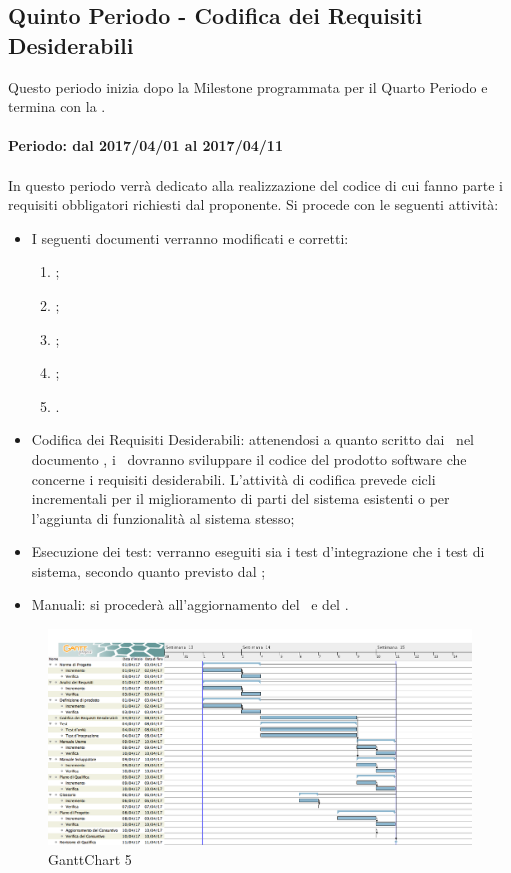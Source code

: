 \documentclass[../PianoDiProgetto_v4.0.0.tex]{subfiles}
\begin{document}
	\newpage
	\subsection{Quinto Periodo - Codifica dei Requisiti Desiderabili}
	Questo periodo inizia dopo la Milestone programmata per il Quarto Periodo e termina con la \revisionediqualifica.
	\\
	\\
	\textbf{Periodo: dal 2017/04/01 al 2017/04/11}
	\\
	\\
	 In questo periodo verrà dedicato alla realizzazione del codice di cui fanno parte i requisiti obbligatori richiesti dal proponente.
	Si procede con le seguenti attività:
	\begin{itemize}
		\item I seguenti documenti verranno modificati e corretti:
			\begin{enumerate}
				\item \manualesviluppatore;
				\item \manualeutente;
				\item \pianodiqualifica;
				\item \pianodiprogetto;
				\item \glossario.
			\end{enumerate}
		\item Codifica dei Requisiti Desiderabili: attenendosi a quanto scritto dai \progettisti\ nel documento , i \programmatori\ dovranno sviluppare il codice del prodotto software che concerne i requisiti desiderabili. L'attività di codifica prevede cicli incrementali per il miglioramento di parti del sistema esistenti o per l'aggiunta di funzionalità al sistema stesso;
		\item Esecuzione dei test: verranno eseguiti sia i test d'integrazione che i test di sistema, secondo quanto previsto dal \pianodiqualifica;		
		\item Manuali: si procederà all'aggiornamento del \manualeutente\ e del \manualesviluppatore.
	\end{itemize}
	
	\newpage
	\begin{figure}[!h]
		\centering
		\includegraphics[width=\textwidth]{Pianificazione/Immagini/GanttChart05.png}
		\caption{GanttChart 5}
	\end{figure}	
	
\end{document}
